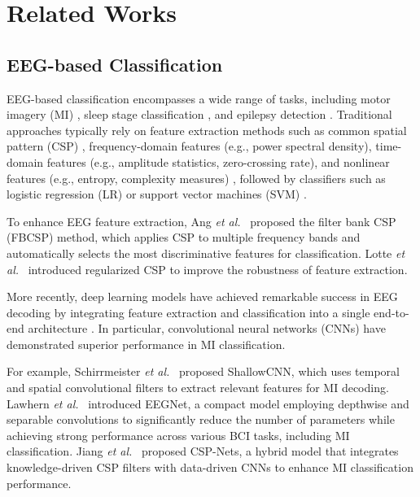 \documentclass[journal,twocolumn]{IEEEtran}
\begin{document}
\section{Related Works}
\label{sec:related}

\subsection{EEG-based Classification}
EEG-based classification encompasses a wide range of tasks, including motor imagery (MI) \cite{decety1996neurophysiological}, sleep stage classification \cite{aboalayon2016sleep}, and epilepsy detection \cite{acharya2013automated}. Traditional approaches typically rely on feature extraction methods such as common spatial pattern (CSP) \cite{Ramoser2000}, frequency-domain features (e.g., power spectral density), time-domain features (e.g., amplitude statistics, zero-crossing rate), and nonlinear features (e.g., entropy, complexity measures) \cite{hassan2017automated}, followed by classifiers such as logistic regression (LR) \cite{cox1958regression} or support vector machines (SVM) \cite{cortes1995support}.

To enhance EEG feature extraction, Ang \textit{et al.}~\cite{4634130} proposed the filter bank CSP (FBCSP) method, which applies CSP to multiple frequency bands and automatically selects the most discriminative features for classification. Lotte \textit{et al.}~\cite{lotte2010regularizing} introduced regularized CSP to improve the robustness of feature extraction.

More recently, deep learning models have achieved remarkable success in EEG decoding by integrating feature extraction and classification into a single end-to-end architecture \cite{craik2019deep, shoeibi2021epileptic}. In particular, convolutional neural networks (CNNs) have demonstrated superior performance in MI classification.

For example, Schirrmeister \textit{et al.}~\cite{schirrmeister2017deep} proposed ShallowCNN, which uses temporal and spatial convolutional filters to extract relevant features for MI decoding. Lawhern \textit{et al.}~\cite{EEGNet} introduced EEGNet, a compact model employing depthwise and separable convolutions to significantly reduce the number of parameters while achieving strong performance across various BCI tasks, including MI classification. Jiang \textit{et al.}~\cite{jiang2024csp} proposed CSP-Nets, a hybrid model that integrates knowledge-driven CSP filters with data-driven CNNs to enhance MI classification performance.
\end{document}
